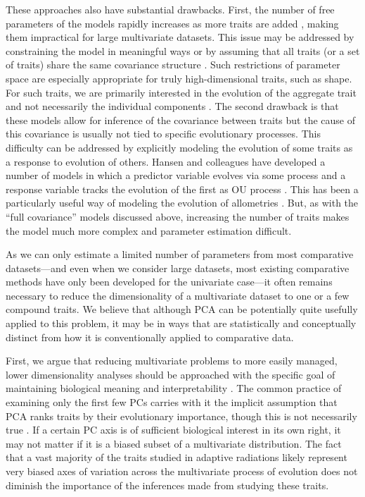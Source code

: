 \documentclass[a4paper,11pt]{article}
\begin{document}
These approaches also have substantial drawbacks. First, the number of free parameters of the models rapidly increases as more traits are added \citep{RevellHarmon2008}, making them impractical for large multivariate datasets. This issue may be addressed by constraining the model in meaningful ways \citep{ButlerKing2004} or by assuming that all traits (or a set of traits) share the same covariance structure \citep{Klingenberg2013, Adams2014, Adams2014b}. Such restrictions of parameter space are especially appropriate for truly high-dimensional traits, such as shape. For such traits, we are primarily interested in the evolution of the aggregate trait and not necessarily the individual components \citep{Adams2014}. The second drawback is that these models allow for inference of the covariance between traits but the cause of this covariance is usually not tied to specific evolutionary processes. This difficulty can be addressed by explicitly modeling the evolution of some traits as a response to evolution of others. Hansen and colleagues have developed a number of models in which a predictor variable evolves via some process and a response variable tracks the evolution of the first as OU process \citep{Hansen2008, Hansen2012SysBio, Bartoszek2012}. This has been a particularly useful way of modeling the evolution of allometries \citep[e.g.,][]{Hansen2012SysBio, Voje2013, Bolstad2014}. But, as with the ``full covariance''  models discussed above, increasing the number of traits makes the model much more complex and parameter estimation difficult.

As we can only estimate a limited number of parameters from most comparative datasets---and even when we consider large datasets, most existing comparative methods have only been developed for the univariate case---it often remains necessary to reduce the dimensionality of a multivariate dataset to one or a few compound traits. We believe that although PCA can be potentially quite usefully applied to this problem, it may be in ways that are statistically and conceptually distinct from how it is conventionally applied to comparative data. 

First, we argue that reducing multivariate problems to more easily managed, lower dimensionality analyses should be approached with the specific goal of maintaining biological meaning and interpretability \citep{Houle2011}. The common practice of examining only the first few PCs carries with it the implicit assumption that PCA ranks traits by their evolutionary importance, though this is not necessarily true \citep{Polly2013}. If a certain PC axis is of sufficient biological interest in its own right, it may not matter if it is a biased subset of a multivariate distribution. The fact that a vast majority of the traits studied in adaptive radiations likely represent very biased axes of variation across the multivariate process of evolution does not diminish the importance of the inferences made from studying these traits. 
\end{document}
